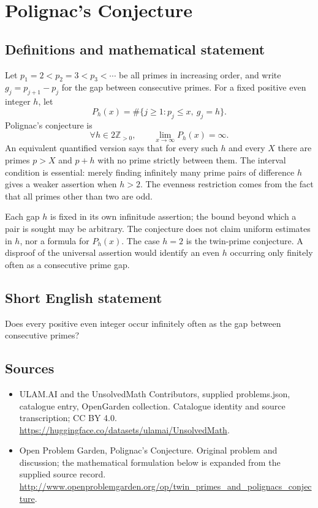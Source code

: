 \documentclass[11pt,a4paper]{article}
\begin{document}
\section*{Polignac's Conjecture}\label{statement}

\subsection{Definitions and mathematical statement}
Let $p_1=2<p_2=3<p_3<\cdots$ be all primes in increasing order, and
write $g_j=p_{j+1}-p_j$ for the gap between consecutive primes.
For a fixed positive even integer $h$, let
\[
 P_h(x)=\#\{j\ge1:p_j\le x,\ g_j=h\}.
\]
Polignac's conjecture is
\[
 \forall h\in2\mathbb Z_{>0},\qquad
              \lim_{x\to\infty}P_h(x)=\infty.
\]
An equivalent quantified version says that for every such $h$ and
every $X$ there are primes $p>X$ and $p+h$ with no prime strictly
between them. The interval condition is essential: merely finding
infinitely many prime pairs of difference $h$ gives a weaker assertion
when $h>2$. The evenness restriction comes from the fact that all
primes other than two are odd.

Each gap $h$ is fixed in its own infinitude assertion; the bound beyond
which a pair is sought may be arbitrary. The conjecture does not claim
uniform estimates in $h$, nor a formula for $P_h(x)$. The case $h=2$
is the twin-prime conjecture. A disproof of the universal assertion
would identify an even $h$ occurring only finitely often as a consecutive
prime gap.
\subsection{Short English statement}
Does every positive even integer occur infinitely often as the gap between consecutive primes?
\subsection{Sources}
\begin{itemize}
\item[S1] ULAM.AI and the UnsolvedMath Contributors, supplied problems.json, catalogue entry, OpenGarden collection. Catalogue identity and source transcription; CC BY 4.0.
\url{https://huggingface.co/datasets/ulamai/UnsolvedMath}.
\item[S2] Open Problem Garden, Polignac's Conjecture. Original problem and discussion; the mathematical formulation below is expanded from the supplied source record.
\url{http://www.openproblemgarden.org/op/twin_primes_and_polignacs_conjecture}.
\end{itemize}
\end{document}
